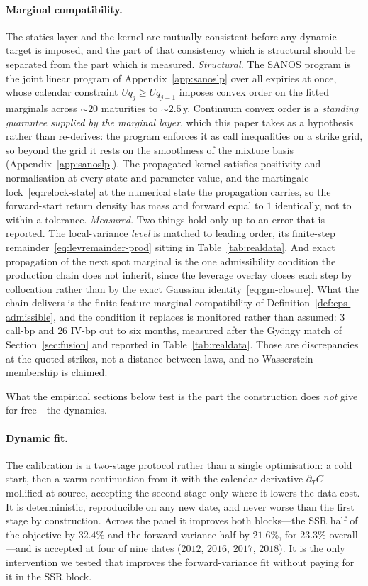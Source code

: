 \documentclass[11pt]{article}
\providecommand{\1}{\mathbf 1}
\begin{document}
\paragraph{Marginal compatibility.} The statics layer and the kernel are mutually consistent before
any dynamic target is imposed, and the part of that consistency which is structural should be
separated from the part which is measured. \emph{Structural.} The SANOS program is the joint linear
program of Appendix~\ref{app:sanoslp} over all expiries at once, whose calendar constraint
$U q_j \ge U q_{j-1}$ imposes convex order on the fitted marginals across ${\sim}20$ maturities to
${\sim}2.5$\,y. Continuum convex order is a \emph{standing guarantee supplied by the marginal
layer}, which this paper takes as a hypothesis rather than re-derives: the program enforces it as
call inequalities on a strike grid, so beyond the grid it rests on the smoothness of the mixture
basis (Appendix~\ref{app:sanoslp}).
The propagated kernel satisfies positivity and normalisation at every state and parameter value, and the martingale
lock~\eqref{eq:relock-state} at the numerical state the propagation carries, so the forward-start
return density has mass and forward equal to $1$ identically, not to within a tolerance.
\emph{Measured.} Two things hold only up to an error that is reported. The local-variance
\emph{level} is matched to leading order, its finite-step remainder~\eqref{eq:levremainder-prod}
sitting in Table~\ref{tab:realdata}. And exact propagation of the next spot marginal is the one
admissibility condition the production chain does not inherit, since the leverage overlay closes each
step by collocation rather than by the exact Gaussian identity~\eqref{eq:gm-closure}. What the chain
delivers is the finite-feature marginal compatibility of
Definition~\ref{def:eps-admissible}, and the condition it replaces is monitored rather than
assumed: $3$ call-bp and $26$ IV-bp out to six months, measured after the Gy\"ongy match of
Section~\ref{sec:fusion} and reported in Table~\ref{tab:realdata}. Those are discrepancies at the
quoted strikes, not a distance between laws, and no Wasserstein membership is claimed.

What the empirical sections below test is the part the construction does \emph{not} give for
free---the dynamics.

\paragraph{Dynamic fit.} The calibration is a two-stage protocol rather than a single optimisation:
a cold start, then a warm continuation from it with the calendar derivative $\partial_T C$ mollified
at source, accepting the second stage only where it lowers the data cost. It is deterministic,
reproducible on any new date, and never worse than the first stage by construction. Across the panel
it improves both blocks---the SSR half of the objective by $32.4\%$ and the forward-variance half by
$21.6\%$, for $23.3\%$ overall---and is accepted at four of nine dates ($2012$, $2016$, $2017$,
$2018$). It is the only intervention we tested that improves the forward-variance fit without paying
for it in the SSR block.
\end{document}
